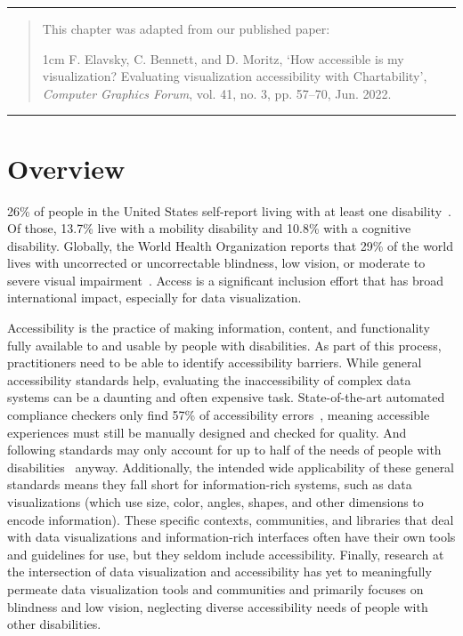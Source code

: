 \documentclass[12pt]{cmuthesis}
\begin{document}
\newpage

\noindent\rule{16cm}{0.4pt}
\begin{quote}
This chapter was adapted from our published paper:
\begin{adjustwidth}{1cm}{}
F. Elavsky, C. Bennett, and D. Moritz, ‘How accessible is my visualization? Evaluating visualization accessibility with Chartability’, \textit{Computer Graphics Forum}, vol. 41, no. 3, pp. 57–70, Jun. 2022.
\end{adjustwidth}
\end{quote}
\noindent\rule{16cm}{0.4pt}

\section{Overview}

26\% of people in the United States self-report living with at least one disability~\cite{Okoro2018Prevalence}. Of those, 13.7\% live with a mobility disability and 10.8\% with a cognitive disability. Globally, the World Health Organization reports that 29\% of the world lives with uncorrected or uncorrectable blindness, low vision, or moderate to severe visual impairment~\cite{OrganizationWorld}. Access is a significant inclusion effort that has broad international impact, especially for data visualization. 

Accessibility is the practice of making information, content, and functionality fully available to and usable by people with disabilities. As part of this process, practitioners need to be able to identify accessibility barriers. While general accessibility standards help, evaluating the inaccessibility of complex data systems can be a daunting and often expensive task. State-of-the-art automated compliance checkers only find 57\% of accessibility errors~\cite{Deque2021Automated}, meaning accessible experiences must still be manually designed and checked for quality. And following standards may only account for up to half of the needs of people with disabilities~\cite{Power2012Guidelines} anyway. Additionally, the intended wide applicability of these general standards means they fall short for information-rich systems, such as data visualizations (which use size, color, angles, shapes, and other dimensions to encode information). These specific contexts, communities, and libraries that deal with data visualizations and information-rich interfaces often have their own tools and guidelines for use, but they seldom include accessibility. Finally, research at the intersection of data visualization and accessibility has yet to meaningfully permeate data visualization tools and communities and primarily focuses on blindness and low vision, neglecting diverse accessibility needs of people with other disabilities.  
\end{document}
